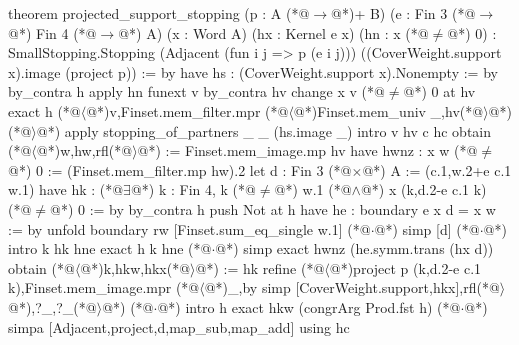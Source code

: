 theorem projected_support_stopping (p : A (*@$\to$@*)+ B) (e : Fin 3 (*@$\to$@*) Fin 4 (*@$\to$@*) A)
    (x : Word A) (hx : Kernel e x) (hn : x (*@$\ne$@*) 0) :
    SmallStopping.Stopping (Adjacent (fun i j => p (e i j)))
      ((CoverWeight.support x).image (project p)) := by
  have hs : (CoverWeight.support x).Nonempty := by
    by_contra h
    apply hn
    funext v
    by_contra hv
    change x v (*@$\ne$@*) 0 at hv
    exact h (*@$\langle$@*)v,Finset.mem_filter.mpr (*@$\langle$@*)Finset.mem_univ _,hv(*@$\rangle$@*)(*@$\rangle$@*)
  apply stopping_of_partners _ _ (hs.image _)
  intro v hv c hc
  obtain (*@$\langle$@*)w,hw,rfl(*@$\rangle$@*) := Finset.mem_image.mp hv
  have hwnz : x w (*@$\ne$@*) 0 := (Finset.mem_filter.mp hw).2
  let d : Fin 3 (*@$\times$@*) A := (c.1,w.2+e c.1 w.1)
  have hk : (*@$\exists$@*) k : Fin 4, k (*@$\ne$@*) w.1 (*@$\land$@*) x (k,d.2-e c.1 k) (*@$\ne$@*) 0 := by
    by_contra h
    push Not at h
    have he : boundary e x d = x w := by
      unfold boundary
      rw [Finset.sum_eq_single w.1]
      (*@$\cdot$@*) simp [d]
      (*@$\cdot$@*) intro k hk hne
        exact h k hne
      (*@$\cdot$@*) simp
    exact hwnz (he.symm.trans (hx d))
  obtain (*@$\langle$@*)k,hkw,hkx(*@$\rangle$@*) := hk
  refine (*@$\langle$@*)project p (k,d.2-e c.1 k),Finset.mem_image.mpr (*@$\langle$@*)_,by simp [CoverWeight.support,hkx],rfl(*@$\rangle$@*),?_,?_(*@$\rangle$@*)
  (*@$\cdot$@*) intro h
    exact hkw (congrArg Prod.fst h)
  (*@$\cdot$@*) simpa [Adjacent,project,d,map_sub,map_add] using hc
